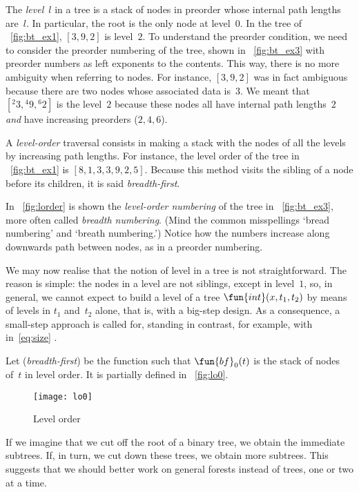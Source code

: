 
The \emph{level}~\(l\) in a tree is a stack of nodes
in preorder whose internal path lengths
are~\(l\). In particular, the root is
the only node at level~\(0\). In the tree of \fig~\vref{fig:bt_ex1},
\([3,9,2]\) is level~\(2\). To understand the preorder condition, we
need to consider the preorder numbering of the tree, shown in
\fig~\vref{fig:bt_ex3} with preorder numbers as left exponents to the
contents. This way, there is no more ambiguity when referring to
nodes. For instance, \([3,9,2]\) was in fact ambiguous because there
are two nodes whose associated data is~\(3\). We meant that
\([{}^{2}{3}, {}^{4}{9}, {}^{6}{2}]\) is the level~\(2\) because these
nodes all have internal path lengths~\(2\) \emph{and} have increasing
preorders (\(2,4,6\)).

A \emph{level-order} traversal consists
in making a stack with the nodes of all the levels by increasing path
lengths. For instance, the level order of the tree in
\fig~\vref{fig:bt_ex1} is \([8,1,3,3,9,2,5]\). Because this method
visits the sibling of a node before its children, it is said
\emph{breadth\hyp{}first}.

In \fig~\vref{fig:lorder} is shown the \emph{level\hyp{}order
  numbering} of the tree in \fig~\vref{fig:bt_ex3}, more often called
\emph{breadth numbering}.   (Mind
the common misspellings `bread numbering' and `breath numbering.')
Notice how the numbers increase along downwards path between nodes, as
in a preorder numbering.

We may now realise that the notion of level in a tree is not
straightforward. The reason is simple: the nodes in a level are not
siblings, except in level~\(1\), so, in
general, we cannot expect to build a level of a tree
\(\fun{int}(x,t_1,t_2)\) by means of levels in \(t_1\) and~\(t_2\)
alone, that is, with a big\hyp{}step design. As a consequence, a small\hyp{}step approach is called for,
standing in contrast, for example, with
 in~\eqref{eq:size}
.

Let 
(\emph{breadth\hyp{}first}) be the function such that
\(\fun{bf}_0(t)\) is the stack of nodes of~\(t\) in level order. It is
partially defined in \fig~\vref{fig:lo0}.
\begin{figure}[t]
\centering
\texttt{[image: lo0]}
\caption{Level order }
\label{fig:lo0}
\end{figure}
If we imagine that we cut off the root of a binary tree, we obtain the
immediate subtrees. If, in turn, we cut down these trees, we obtain
more subtrees. This suggests that we should better work on general
forests instead of trees, one or two at a time.

